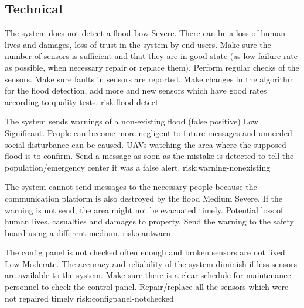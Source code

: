 

\subsection{Technical}

{The system does not detect a flood}
{Low}
{Severe. There can be a loss of human lives and damages, loss of trust in the system by end-users.}
{Make sure the number of sensors is sufficient and that they are in good state (as low failure rate as possible, when necessary repair or replace them). Perform regular checks of the sensors. Make sure faults in sensors are reported. }
{Make changes in the algorithm for the flood detection, add more and new sensors which have good rates according to quality tests.}
{risk:flood-detect}

{The system sends warnings of a non-existing flood (false positive)} %
{Low}
{Significant. People can become more negligent to future messages and unneeded social disturbance can be caused.}
{UAVs watching the area where the supposed flood is to confirm.}
{Send a message as soon as the mistake is detected to tell the population/emergency center it was a false alert. }
{risk:warning-nonexisting}

{The system cannot send messages to the necessary people because the communication platform is also destroyed by the flood}
{Medium}
{Severe. If the warning is not send, the area might not be evacuated timely. Potential loss of human lives, casualties and damages to property. }
{}
{Send the warning to the safety board using a different medium.}
{risk:cantwarn}
	
{The config panel is not checked often enough and broken sensors are not fixed}
{Low}
{Moderate. The accuracy and reliability of the system diminish if less sensors are available to the system.}
{Make sure there is a clear schedule for maintenance personnel to check the control panel.}
{Repair/replace all the sensors which were not repaired timely}
{risk:configpanel-notchecked}
	

